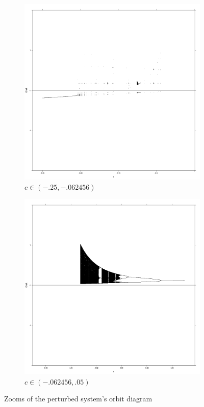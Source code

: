 		\begin{figure}[h]
			\centering
			\begin{subfigure}[b]{0.5\textwidth}
					\includegraphics[width=\textwidth]{./img/pertzoom2}
					\caption{$c\in (-.25, -.062456)$}
					\label{pertz2}
			\end{subfigure}%
			\begin{subfigure}[b]{0.5\textwidth}
					\includegraphics[width=\textwidth]{./img/pertzoom1}
					\caption{$c\in (-.062456, .05)$}
					\label{pertz1}%
			\end{subfigure}
			\caption{Zooms of the perturbed system's orbit diagram}\label{fig:orbits2}
		\end{figure}